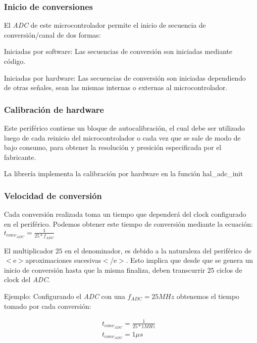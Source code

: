 \subsubsection*{Inicio de conversiones}

El {\itshape A\+DC} de este microcontrolador permite el inicio de secuencia de conversión/canal de dos formas\+:
\begin{DoxyEnumerate}
\item Iniciadas por software\+: Las secuencias de conversión son iniciadas mediante código.
\item Iniciadas por hardware\+: Las secuencias de conversión son iniciadas dependiendo de otras señales, sean las mismas internas o externas al microcontrolador.
\end{DoxyEnumerate}\subsubsection*{Calibración de hardware}

Este periférico contiene un bloque de autocalibración, el cual debe ser utilizado luego de cada reinicio del microcontrolador o cada vez que se sale de modo de bajo consumo, para obtener la resolución y presición especificada por el fabricante.

La librería implementa la calibración por hardware en la función hal\+\_\+adc\+\_\+init

\subsubsection*{Velocidad de conversión}

Cada conversión realizada toma un tiempo que dependerá del clock configurado en el periférico. Podemos obtener este tiempo de conversión mediante la ecuación\+: $ t_{conv_{ADC}} = \frac{1}{25 * f_{ADC}} $

El multiplicador $ 25 $ en el denominador, es debido a la naturaleza del periférico de $<$e$>$aproximaciones sucesivas$<$/e$>$. Esto implica que desde que se genera un inicio de conversión hasta que la misma finaliza, deben transcurrir $ 25 $ ciclos de clock del {\itshape A\+DC}.

Ejemplo\+: Configurando el {\itshape A\+DC} con una $f_{ADC} = 25MHz$ obtenemos el tiempo tomado por cada conversión\+:

\begin{eqnarray*} t_{conv_{ADC}} = \frac{1}{25 * 1MHz} \\ t_{conv_{ADC}} = 1 \mu s \end{eqnarray*}

